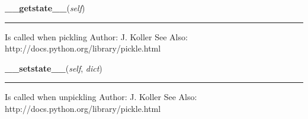 \hspace{.8\funcindent}\begin{boxedminipage}{\funcwidth}

    \raggedright \textbf{\_\_getstate\_\_}(\textit{self})

    \vspace{-1.5ex}

    \rule{\textwidth}{0.5\fboxrule}
\setlength{\parskip}{2ex}
    Is called when pickling Author: J. Koller See Also: 
    http://docs.python.org/library/pickle.html

\setlength{\parskip}{1ex}
    \end{boxedminipage}

    \label{spacepy:spacetime:TickTock:__setstate__}

    \vspace{0.5ex}

\hspace{.8\funcindent}\begin{boxedminipage}{\funcwidth}

    \raggedright \textbf{\_\_setstate\_\_}(\textit{self}, \textit{dict})

    \vspace{-1.5ex}

    \rule{\textwidth}{0.5\fboxrule}
\setlength{\parskip}{2ex}
    Is called when unpickling Author: J. Koller See Also: 
    http://docs.python.org/library/pickle.html

\setlength{\parskip}{1ex}
    \end{boxedminipage}

    \label{spacepy:spacetime:TickTock:__getitem__}

    \vspace{0.5ex}

